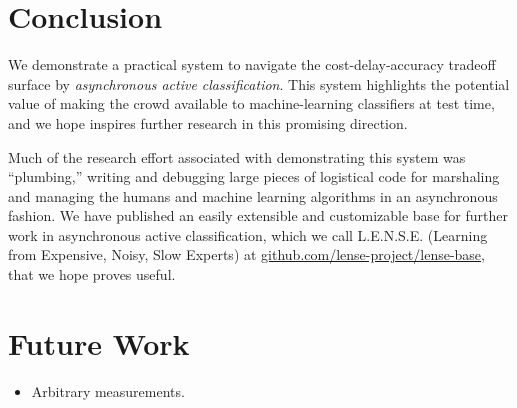 \section{Conclusion}
\label{sec:conclusion}

We demonstrate a practical system to navigate the cost-delay-accuracy tradeoff surface by \textit{asynchronous active classification}.
 This system highlights the potential value of making the crowd available to machine-learning classifiers at test time, and we hope inspires further research in this promising direction.

Much of the research effort associated with demonstrating this system was ``plumbing,'' writing and debugging large pieces of logistical code for marshaling and managing the humans and machine learning algorithms in an asynchronous fashion.
 We have published an easily extensible and customizable base for further work in asynchronous active classification, which we call L.E.N.S.E. (Learning from Expensive, Noisy, Slow Experts) at \url{github.com/lense-project/lense-base}, that we hope proves useful.

\section{Future Work}

\begin{itemize}
  \item Arbitrary measurements.
\end{itemize}

